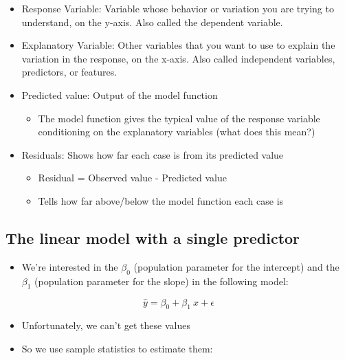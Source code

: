 \documentclass[
]{article}
\providecommand{\tightlist}{%
  \setlength{\itemsep}{0pt}\setlength{\parskip}{0pt}}
\begin{document}
\begin{itemize}
\item
  Response Variable: Variable whose behavior or variation you are trying
  to understand, on the y-axis. Also called the dependent variable.
\item
  Explanatory Variable: Other variables that you want to use to explain
  the variation in the response, on the x-axis. Also called independent
  variables, predictors, or features.
\item
  Predicted value: Output of the model function

  \begin{itemize}
  \tightlist
  \item
    The model function gives the typical value of the response variable
    conditioning on the explanatory variables (what does this mean?)
  \end{itemize}
\item
  Residuals: Shows how far each case is from its predicted value

  \begin{itemize}
  \tightlist
  \item
    Residual = Observed value - Predicted value
  \item
    Tells how far above/below the model function each case is
  \end{itemize}
\end{itemize}

\hypertarget{the-linear-model-with-a-single-predictor}{%
\subsection{The linear model with a single
predictor}\label{the-linear-model-with-a-single-predictor}}

\begin{itemize}
\tightlist
\item
  We're interested in the \(\beta_0\) (population parameter for the
  intercept) and the \(\beta_1\) (population parameter for the slope) in
  the following model:
\end{itemize}

\[ \hat{y} = \beta_0 + \beta_1~x + \epsilon \]

\begin{itemize}
\item
  Unfortunately, we can't get these values
\item
  So we use sample statistics to estimate them:
\end{itemize}
\end{document}
